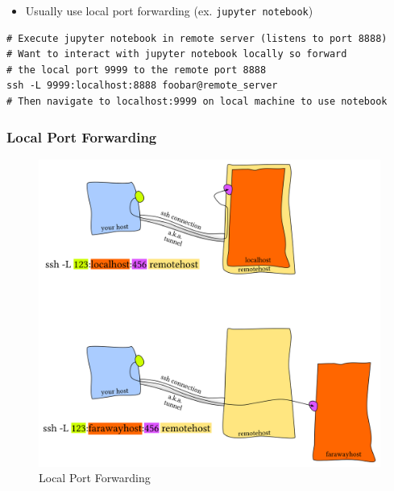 \documentclass[letterpaper,12pt]{article}
\begin{document}
\begin{itemize}
 \item Usually use local port forwarding (ex. \lstinline{jupyter notebook})
\end{itemize}

\begin{lstlisting}
# Execute jupyter notebook in remote server (listens to port 8888)
# Want to interact with jupyter notebook locally so forward
# the local port 9999 to the remote port 8888
ssh -L 9999:localhost:8888 foobar@remote_server
# Then navigate to localhost:9999 on local machine to use notebook
\end{lstlisting}

\subsubsection{Local Port Forwarding}

\begin{figure}[H]
 \includegraphics[width=160mm, scale=0.75]{pictures/local-port-forwarding.png}
 \caption{Local Port Forwarding}
\end{figure}
\end{document}
